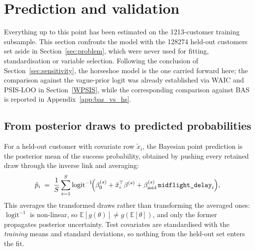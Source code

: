 
\providecommand{\TODO}[1]{\textbf{[TODO: #1]}}
\providecommand{\figplaceholder}[1]{%
  \framebox[0.8\textwidth]{%
    \parbox[c][4cm][c]{0.75\textwidth}{\centering\itshape #1}}}

\section{Prediction and validation}
\label{sec:prediction}
Everything up to this point has been estimated on the \num{1213}-customer
training subsample. This section confronts the model with the \num{128274}
held-out customers set aside in Section~\ref{sec:problem}, which were never
used for fitting, standardisation or variable selection. Following the conclusion of Section~\ref{sec:sensitivity}, the horseshoe model is the one carried forward here; the comparison against the vague-prior logit was already established via WAIC and PSIS-LOO in Section~\ref{WPSIS}, while the corresponding comparison against BAS is reported in Appendix~\ref{app:bas_vs_hs}.

\subsection{From posterior draws to predicted probabilities}
For a held-out customer with covariate row $\tilde{x}_i$, the Bayesian point
prediction is the posterior mean of the success probability, obtained by
pushing every retained draw through the inverse link and averaging:
\begin{equation}
  \hat{p}_i \;=\;
  \frac{1}{S}\sum_{s=1}^{S}
  \operatorname{logit}^{-1}\!\Bigl(
      \beta_0^{(s)} + \tilde{x}_i^{\top}\beta^{(s)}
      + \beta_{\text{mid}}^{(s)}\,\texttt{midflight\_delay}_i
  \Bigr),
  \label{eq:postpred}
\end{equation}
This averages the transformed draws rather than transforming the averaged
ones: $\operatorname{logit}^{-1}$ is non-linear, so
$\mathbb{E}[g(\theta)] \neq g(\mathbb{E}[\theta])$, and only the former
propagates posterior uncertainty. Test covariates are standardised with the
\emph{training} means and standard deviations, so nothing from the held-out
set enters the fit.

